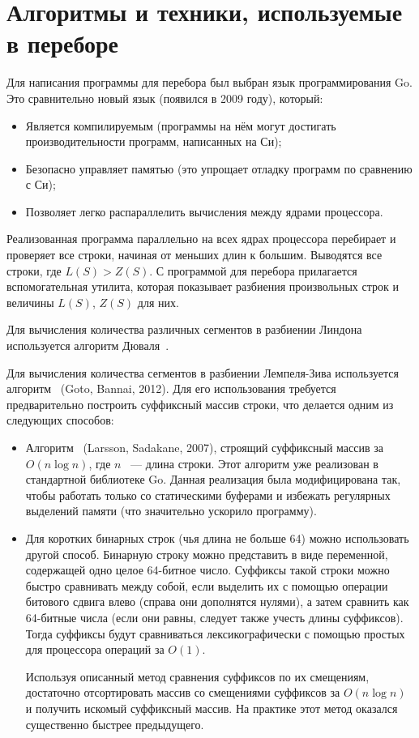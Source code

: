 \section{Алгоритмы и техники, используемые в переборе}

Для написания программы для перебора был выбран язык программирования Go. Это сравнительно новый язык (появился в 2009 году), который:

\begin{itemize}
    \item Является компилируемым (программы на нём могут достигать производительности программ, написанных на Си);
    \item Безопасно управляет памятью (это упрощает отладку программ по сравнению с Си);
    \item Позволяет легко распараллелить вычисления между ядрами процессора.
\end{itemize}

Реализованная программа параллельно на всех ядрах процессора перебирает и проверяет все строки, начиная от меньших длин к большим. Выводятся все строки, где $ L(S) > Z(S) $. С программой для перебора прилагается вспомогательная утилита, которая показывает разбиения произвольных строк и величины $L(S)$, $Z(S)$ для них.

Для вычисления количества различных сегментов в разбиении Линдона используется алгоритм Дюваля~\cite{Duval-1988}.

Для вычисления количества сегментов в разбиении Лемпеля-Зива используется алгоритм~\cite{Goto-Bannai-2012} (Goto, Bannai, 2012). Для его использования требуется предварительно построить суффиксный массив строки, что делается одним из следующих способов:

\begin{itemize}
    \item Алгоритм~\cite{Larsson-Sadakane-2007} (Larsson, Sadakane, 2007), строящий суффиксный массив за $O(n \log n)$, где $n$ ~--- длина строки. Этот алгоритм уже реализован в стандартной библиотеке Go. Данная реализация была модифицирована так, чтобы работать только со статическими буферами и избежать регулярных выделений памяти (что значительно ускорило программу).
    
    \item Для коротких бинарных строк (чья длина не больше 64) можно использовать другой способ. Бинарную строку можно представить в виде переменной, содержащей одно целое 64-битное число. Суффиксы такой строки можно быстро сравнивать между собой, если выделить их с помощью операции битового сдвига влево (справа они дополнятся нулями), а затем сравнить как 64-битные числа (если они равны, следует также учесть длины суффиксов). Тогда суффиксы будут сравниваться лексикографически с помощью простых для процессора операций за $ O(1) $.
    
    Используя описанный метод сравнения суффиксов по их смещениям, достаточно отсортировать массив со смещениями суффиксов за $ O(n \log n) $ и получить искомый суффиксный массив. На практике этот метод оказался существенно быстрее предыдущего.
\end{itemize}

